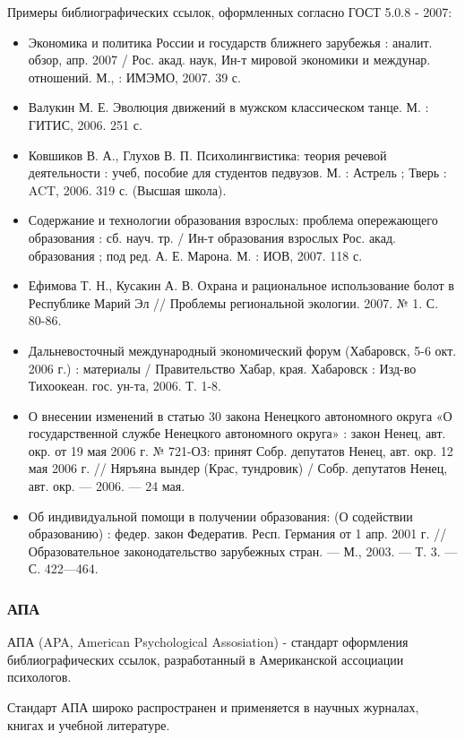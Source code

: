 Примеры библиографических ссылок, оформленных согласно ГОСТ 5.0.8 - 2007:
\begin{itemize}
	\item Экономика и политика России и государств ближнего зарубежья : аналит. обзор, апр. 2007 / Рос. акад. наук, Ин-т мировой экономики и междунар. отношений. М., : ИМЭМО, 2007. 39 с.
	\item Валукин М. Е. Эволюция движений в мужском классическом танце. М. : ГИТИС, 2006. 251 с.
	\item Ковшиков В. А., Глухов В. П. Психолингвистика: теория речевой деятельности : учеб, пособие для студентов педвузов. М. : Астрель ; Тверь : ACT, 2006. 319 с. (Высшая школа).
	\item Содержание и технологии образования взрослых: проблема опережающего образования : сб. науч. тр. / Ин-т образования взрослых Рос. акад. образования ; под ред. А. Е. Марона. М. : ИОВ, 2007. 118 с.
	\item Ефимова Т. Н., Кусакин А. В. Охрана и рациональное использование болот в Республике Марий Эл // Проблемы региональной экологии. 2007. № 1. С. 80-86.
	\item Дальневосточный международный экономический форум (Хабаровск, 5-6 окт. 2006 г.) : материалы / Правительство Хабар, края. Хабаровск : Изд-во Тихоокеан. гос. ун-та, 2006. Т. 1-8.
	\item О внесении изменений в статью 30 закона Ненецкого автономного округа «О государственной службе Ненецкого автономного округа» : закон Ненец, авт. окр. от 19 мая 2006 г. № 721-ОЗ: принят Собр. депутатов Ненец, авт. окр. 12 мая 2006 г. // Няръяна вындер (Крас, тундровик) / Собр. депутатов Ненец, авт. окр. — 2006. — 24 мая.
	\item Об индивидуальной помощи в получении образования: (О содействии образованию) : федер. закон Федератив. Респ. Германия от 1 апр. 2001 г. // Образовательное законодательство зарубежных стран. — М., 2003. — Т. 3. — С. 422—464.
\end{itemize}

\subsubsection{АПА}

АПА (APA, American Psychological Assosiation) - стандарт оформления библиографических ссылок, разработанный в Американской ассоциации психологов.

Стандарт АПА широко распространен и применяется в научных журналах, книгах и учебной литературе.


